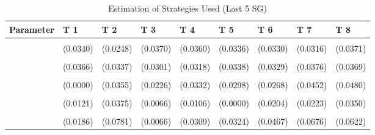 \begin{table}[!h]
\centering
\caption{Estimation of Strategies Used (Last 5 SG)}
\centering
\begin{tabular}[t]{lllllllll}
\toprule
Parameter & T 1 & T 2 & T 3 & T 4 & T 5 & T 6 & T 7 & T 8\\
\midrule
\cellcolor{gray!10}{gamma} & \cellcolor{gray!10}{0.6153***} & \cellcolor{gray!10}{0.5154***} & \cellcolor{gray!10}{0.5748***} & \cellcolor{gray!10}{0.6203***} & \cellcolor{gray!10}{0.6181***} & \cellcolor{gray!10}{0.6619***} & \cellcolor{gray!10}{0.6138***} & \cellcolor{gray!10}{0.6781***}\\
 & (0.0340) & (0.0248) & (0.0370) & (0.0360) & (0.0336) & (0.0330) & (0.0316) & (0.0371)\\
\cellcolor{gray!10}{AD} & \cellcolor{gray!10}{0.4779***} & \cellcolor{gray!10}{0.3522***} & \cellcolor{gray!10}{0.7981***} & \cellcolor{gray!10}{0.6993***} & \cellcolor{gray!10}{0.7546***} & \cellcolor{gray!10}{0.7587***} & \cellcolor{gray!10}{0.3603***} & \cellcolor{gray!10}{0.3975***}\\
 & (0.0366) & (0.0337) & (0.0301) & (0.0318) & (0.0338) & (0.0329) & (0.0376) & (0.0369)\\
\cellcolor{gray!10}{AC} & \cellcolor{gray!10}{0.0000} & \cellcolor{gray!10}{0.0505} & \cellcolor{gray!10}{0.1115***} & \cellcolor{gray!10}{0.1747***} & \cellcolor{gray!10}{0.1120***} & \cellcolor{gray!10}{0.1342***} & \cellcolor{gray!10}{0.1644***} & \cellcolor{gray!10}{0.1093*}\\
\addlinespace
 & (0.0000) & (0.0355) & (0.0226) & (0.0332) & (0.0298) & (0.0268) & (0.0452) & (0.0480)\\
\cellcolor{gray!10}{G} & \cellcolor{gray!10}{0.1612***} & \cellcolor{gray!10}{0.1230**} & \cellcolor{gray!10}{0.0124} & \cellcolor{gray!10}{0.0000} & \cellcolor{gray!10}{0.0000} & \cellcolor{gray!10}{0.0037} & \cellcolor{gray!10}{0.0129} & \cellcolor{gray!10}{0.1409***}\\
 & (0.0121) & (0.0375) & (0.0066) & (0.0106) & (0.0000) & (0.0204) & (0.0223) & (0.0350)\\
\cellcolor{gray!10}{TFT} & \cellcolor{gray!10}{0.1624***} & \cellcolor{gray!10}{0.2902***} & \cellcolor{gray!10}{0.0124} & \cellcolor{gray!10}{0.0675*} & \cellcolor{gray!10}{0.1334***} & \cellcolor{gray!10}{0.0997*} & \cellcolor{gray!10}{0.2939***} & \cellcolor{gray!10}{0.0586}\\
 & (0.0186) & (0.0781) & (0.0066) & (0.0309) & (0.0324) & (0.0467) & (0.0676) & (0.0622)\\

\end{tabular}
\end{table}
